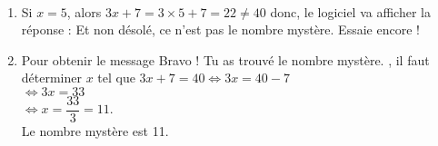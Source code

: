 \ \\ [-5mm]
   \begin{enumerate}
      \item Si $x =5$, alors $3x+7 =3\times5+7 =22\neq40$ donc, le logiciel va afficher la réponse : {\blue Et non désolé, ce n'est pas le nombre mystère. Essaie encore !}
      \item Pour obtenir le message \og Bravo ! Tu as trouvé le nombre mystère. \fg, il faut déterminer $x$ tel que $3x+7 =40 \iff 3x =40-7$ \\
         \hspace*{17mm} $\iff 3x =33$ \\ [1mm]
         \hspace*{17mm} $\iff x =\dfrac{33}{3} =11$. \\ [1mm]
         {\blue Le nombre mystère est 11}.
   \end{enumerate}
